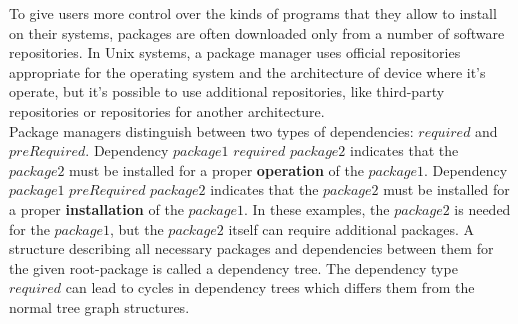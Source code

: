 To give users more control over the kinds of programs that they allow to install on their systems, packages are often downloaded only from a number of software repositories.
In Unix systems, a package manager uses official repositories appropriate for the operating system and the architecture  of device where it's operate, but it's possible to use additional repositories, like third-party repositories or repositories for another architecture.\\
Package managers distinguish between two types of dependencies: $required$ and $preRequired$. %
Dependency $package1$ \textbf{$required$} $package2$ indicates that the $package2$ must be installed for a proper \textbf{operation} of the $package1$. %
Dependency $package1$ \textbf{$preRequired$} $package2$ indicates that the $package2$ must be installed for a proper \textbf{installation} of the $package1$. %
In these examples, the $package2$ is needed for the $package1$, but the $package2$ itself can require additional packages.
A structure describing all necessary packages and dependencies between them for the given root-package is called a dependency tree. 
The dependency type $required$ can lead to cycles in dependency trees which differs them from the normal tree graph structures.
